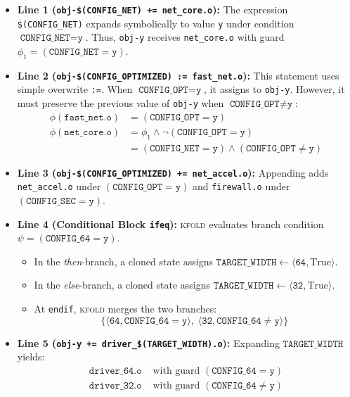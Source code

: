 \documentclass[acmsmall,screen,review]{acmart}
\newcommand{\tool}{\textsc{kfold}\xspace}
\begin{document}
\begin{itemize}
\item \textbf{Line 1 (\texttt{obj-\$(CONFIG\_NET) += net\_core.o}):} The expression \texttt{\$(CONFIG\_NET)} expands symbolically to value \texttt{y} under condition $\texttt{CONFIG\_NET}=\texttt{y}$. Thus, \texttt{obj-y} receives \texttt{net\_core.o} with guard $\phi_1 = (\texttt{CONFIG\_NET}=\texttt{y})$.
\item \textbf{Line 2 (\texttt{obj-\$(CONFIG\_OPTIMIZED) := fast\_net.o}):} This statement uses simple overwrite \texttt{:=}. When $\texttt{CONFIG\_OPT}=\texttt{y}$, it assigns to \texttt{obj-y}. However, it must preserve the previous value of \texttt{obj-y} when $\texttt{CONFIG\_OPT}\neq\texttt{y}$:
\begin{align*}
\phi(\mathtt{fast\_net.o}) &= (\texttt{CONFIG\_OPT}=\texttt{y}) \\
\phi(\mathtt{net\_core.o}) &= \phi_1 \wedge \neg(\texttt{CONFIG\_OPT}=\texttt{y}) \\
&= (\texttt{CONFIG\_NET}=\texttt{y}) \wedge (\texttt{CONFIG\_OPT}\neq\texttt{y})
\end{align*}
\item \textbf{Line 3 (\texttt{obj-\$(CONFIG\_OPTIMIZED) += net\_accel.o}):} Appending adds \texttt{net\_accel.o} under $(\texttt{CONFIG\_OPT}=\texttt{y})$ and \texttt{firewall.o} under $(\texttt{CONFIG\_SEC}=\texttt{y})$.
\item \textbf{Line 4 (Conditional Block \texttt{ifeq}):} \tool evaluates branch condition $\psi = (\texttt{CONFIG\_64}=\texttt{y})$.
  \begin{itemize}
  \item In the \emph{then}-branch, a cloned state assigns $\mathtt{TARGET\_WIDTH} \gets \langle \mathtt{64}, \text{True} \rangle$.
  \item In the \emph{else}-branch, a cloned state assigns $\mathtt{TARGET\_WIDTH} \gets \langle \mathtt{32}, \text{True} \rangle$.
  \item At \texttt{endif}, \tool merges the two branches:
  $$\{ \langle \mathtt{64}, \texttt{CONFIG\_64}=\texttt{y} \rangle, \; \langle \mathtt{32}, \texttt{CONFIG\_64}\neq\texttt{y} \rangle \}$$
  \end{itemize}
\item \textbf{Line 5 (\texttt{obj-y += driver\_\$(TARGET\_WIDTH).o}):} Expanding $\mathtt{TARGET\_WIDTH}$ yields:
  \begin{align*}
  \mathtt{driver\_64.o} &\text{ with guard } (\texttt{CONFIG\_64}=\texttt{y}) \\
  \mathtt{driver\_32.o} &\text{ with guard } (\texttt{CONFIG\_64}\neq\texttt{y})
  \end{align*}
\end{itemize}
\end{document}

